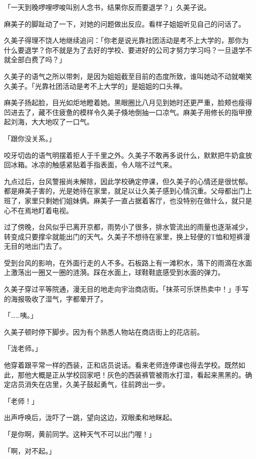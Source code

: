 \documentclass[UTF8]{ctexart}
\begin{document}
    「一天到晚啰哩啰唆叫别人念书，结果你反而要退学？」久美子说。 

    麻美子的脚趾动了一下，对她的问题做出反应。看样子姐姐听见自己的问话了。 

    久美子得理不饶人地继续追问：「你老是说光靠社团活动是考不上大学的，那你为什么要退学？你不就是为了去好的学校、要进好的公司才努力学习吗？一旦退学不就全部白费了吗？」 

    久美子的语气之所以带刺，是因为姐姐截至目前的态度所致，谁叫她动不动就嘲笑久美子。「光靠社团活动是考不上大学的」是姐姐的口头禅。 

    麻美子扬起脸，目光如炬地瞪着她。黑眼圈比八月见到她时还更严重，脸颊也瘦得凹进去了，藏不住疲惫的模样令久美子倏地倒抽一口凉气。麻美子用修长的指甲撩起刘海，大大地叹了一口气。 

    「跟你没关系。」 

    咬牙切齿的语气明摆着拒人于千里之外。久美子不敢再多说什么，默默把牛奶盒放回冰箱。冰凉的触感紧贴着手指表面，令人喘不过气来。 

    九点过后，台风警报尚未解除，因此学校确定停课，但久美子的心情还是很忧郁。都是麻美子害的，光是她待在家里，就足以让久美子感到心情沉重。父母都出门上班了，家里只剩她们姐妹俩。麻美子一直占据着客厅，也没特别在做什么，就只是心不在焉地盯着电视。 

    过了傍晚，台风似乎已离开京都，雨势小了很多，排水管流出的雨量也逐渐减少，转变成只要撑伞就能出门的天气。久美子不想待在家里，换上轻便的T恤和短裤漫无目的地出门去了。 

    受到台风的影响，在外面行走的人不多。石板路上有一滩积水，落下的雨滴在水面上激荡出一圈又一圈的涟漪。踩在水面上，球鞋鞋底感受到水面的弹力。 

    久美子穿过平等院通，漫无目的地走向宇治商店街。「抹茶可乐饼热卖中！」手写的海报吸收了湿气，字都晕开了。 

    「……咦。」 

    久美子顿时停下脚步。因为有个熟悉人物站在商店街上的花店前。 

    「泷老师。」 

    他穿着跟平常一样的西装，正和店员说话。看来老师连停课也得去学校。既然如此，那他大概是正从学校回家吧！灰色的西装裤管被雨水打湿，看起来黑黑的。确定店员消失在店里，久美子鼓起勇气，往前跨出一步。 

    「老师！」 

    出声呼唤后，泷吓了一跳，望向这边，双眼柔和地眯起。 

    「是你啊，黄前同学。这种天气不可以出门喔！」 

    「啊，对不起。」 
\end{document}
